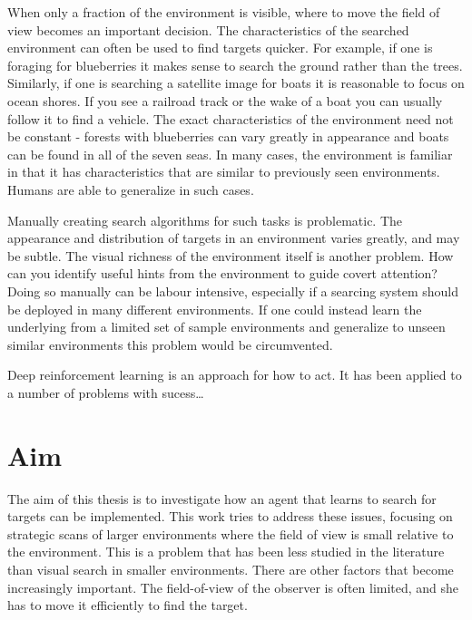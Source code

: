 When only a fraction of the environment is visible, where to move the field of view becomes an important decision.
The characteristics of the searched environment can often be used to find targets quicker.
For example, if one is foraging for blueberries it makes sense to search the ground rather than the trees.
Similarly, if one is searching a satellite image for boats it is reasonable to focus on ocean shores.
If you see a railroad track or the wake of a boat you can usually follow it to find a vehicle.
The exact characteristics of the environment need not be constant - forests with blueberries can vary greatly in appearance and boats can be found in all of the seven seas.
In many cases, the environment is familiar in that it has characteristics that are similar to previously seen environments.
Humans are able to generalize in such cases.

Manually creating search algorithms for such tasks is problematic.
The appearance and distribution of targets in an environment varies greatly, and may be subtle.
The visual richness of the environment itself is another problem.
How can you identify useful hints from the environment to guide covert attention?
Doing so manually can be labour intensive, especially if a searcing system should be deployed in many different environments.
If one could instead learn the underlying from a limited set of sample environments and generalize to unseen similar environments this problem would be circumvented.

Deep reinforcement learning is an approach for how to act.
It has been applied to a number of problems with sucess\dots

\section{Aim}
\label{sec:aim}


The aim of this thesis is to investigate how an agent that learns to search for targets can be implemented.
This work tries to address these issues, focusing on strategic scans of larger environments where the field of view is small relative to the environment.
This is a problem that has been less studied in the literature than visual search in smaller environments.
There are other factors that become increasingly important. The field-of-view of the observer is often limited, and she has to move it efficiently to find the target.

